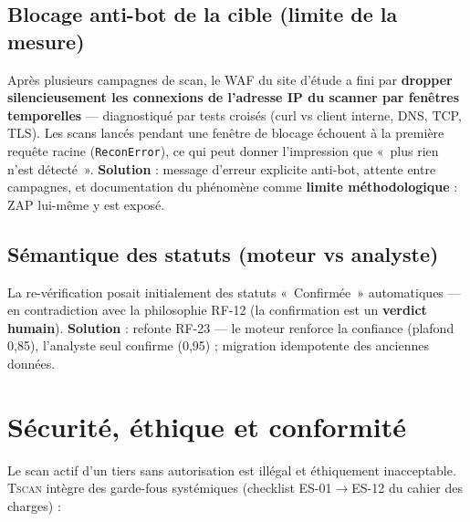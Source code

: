 \documentclass[11pt,a4paper]{report}
\newcommand{\tscan}{\textsc{Tscan}}
\newcommand{\code}[1]{\texttt{#1}}
\begin{document}
\section{Blocage anti-bot de la cible (limite de la mesure)}

Après plusieurs campagnes de scan, le WAF du site d'étude a fini par \textbf{dropper
silencieusement les connexions de l'adresse IP du scanner par fenêtres temporelles} ---
diagnostiqué par tests croisés (curl vs client interne, DNS, TCP, TLS). Les scans lancés
pendant une fenêtre de blocage échouent à la première requête racine (\code{ReconError}),
ce qui peut donner l'impression que «~plus rien n'est détecté~». \textbf{Solution} :
message d'erreur explicite anti-bot, attente entre campagnes, et documentation du
phénomène comme \textbf{limite méthodologique} : ZAP lui-même y est exposé.

\section{Sémantique des statuts (moteur vs analyste)}

La re-vérification posait initialement des statuts «~Confirmée~» automatiques --- en
contradiction avec la philosophie RF-12 (la confirmation est un \textbf{verdict humain}).
\textbf{Solution} : refonte RF-23 --- le moteur renforce la confiance (plafond 0,85),
l'analyste seul confirme (0,95) ; migration idempotente des anciennes données.

\chapter{Sécurité, éthique et conformité}

Le scan actif d'un tiers sans autorisation est illégal et éthiquement inacceptable.
\tscan{} intègre des garde-fous systémiques (checklist ES-01$\rightarrow$ES-12 du cahier
des charges) :
\end{document}
